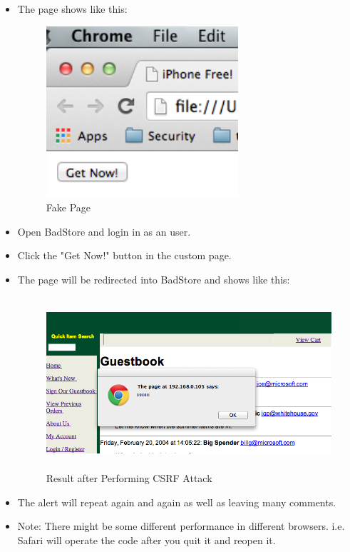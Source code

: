 \begin{enumerate}
\begin{itemize}
\begin{lstlisting}[language=HTML,numbers=left,numberstyle=\tiny,columns=fullflexible,basicstyle=\footnotesize\ttfamily]
		\end{lstlisting}
	\item The page shows like this:
	\begin{figure}[h!]
			\caption{Fake Page}
			\begin{center}\includegraphics[height=2.5in]{csrf1}
			\end{center}
		\end{figure}
	\item Open BadStore and login in as an user.
	\item Click the "Get Now!" button in the custom page.
	\item The page will be redirected into BadStore and shows like this:
	\begin{figure}[h!]
			\caption{Result after Performing CSRF Attack}
			\begin{center}\includegraphics[height=2.5in]{csrf2}
			\end{center}
		\end{figure}
	\item The alert will repeat again and again as well as leaving many comments.
	\item Note: There might be some different performance in different browsers. i.e. Safari will operate the code after you quit it and reopen it.
	\end{itemize}

\end{enumerate}
